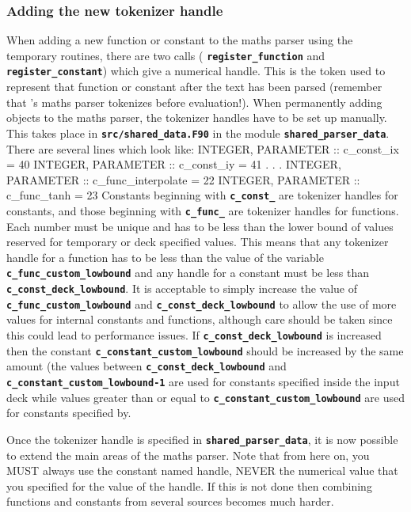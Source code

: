 \documentclass[12pt,a4paper]{article}
\newcommand{\inlinecode}[1]{{\color{warwickred} \bf\texttt{#1}}}
\newcommand{\EPOCH}{{\color{warwickdark}\fontfamily{phv}\selectfont{EPOCH}}}
\newenvironment{boxverbatim}{\lboxverbatim{none}}{\endlboxverbatim}
\begin{document}
\subsubsection{Adding the new tokenizer handle}
When adding a new function or constant to the maths parser using the temporary
routines, there are two calls (\inlinecode{register\_function} and
\inlinecode{register\_constant}) which give a numerical handle. This is the
token used to represent that function or constant after the text has been parsed
(remember that {\EPOCH}'s maths parser tokenizes before evaluation!). When
permanently adding objects to the maths parser, the tokenizer handles have to
be set up manually. This takes place in \inlinecode{src/shared\_data.F90} in
the module \inlinecode{shared\_parser\_data}. There are several lines which
look like:
\begin{boxverbatim}
  INTEGER, PARAMETER :: c_const_ix = 40
  INTEGER, PARAMETER :: c_const_iy = 41
  .
  .
  .
  INTEGER, PARAMETER :: c_func_interpolate = 22
  INTEGER, PARAMETER :: c_func_tanh = 23
\end{boxverbatim}
Constants beginning with \inlinecode{c\_const\_} are tokenizer handles for
constants, and those beginning with \inlinecode{c\_func\_} are tokenizer handles
for functions. Each number must be unique and has to be less than
the lower bound of values reserved for temporary or deck
specified values. This means that any tokenizer handle for a function has to be
less than the value of the variable \inlinecode{c\_func\_custom\_lowbound} and
any handle for a constant must be less than
\inlinecode{c\_const\_deck\_lowbound}. It is acceptable to simply increase the
value of \inlinecode{c\_func\_custom\_lowbound} and
\inlinecode{c\_const\_deck\_lowbound} to
allow the use of more values for internal constants and functions, although
care should be taken since this could lead to performance issues.
If \inlinecode{c\_const\_deck\_lowbound} is increased then the constant
\inlinecode{c\_constant\_custom\_lowbound} should be increased by the same
amount (the values between \inlinecode{c\_const\_deck\_lowbound} and\linebreak
\inlinecode{c\_constant\_custom\_lowbound-1} are used for constants specified
inside the input deck while values greater than or equal to
\inlinecode{c\_constant\_custom\_lowbound} are used for constants specified
by\linebreak \inlinecode{register\_constant}.

Once the tokenizer handle is specified in \inlinecode{shared\_parser\_data}, it
is now possible to extend the main areas of the maths parser. Note that from
here on, you MUST always use the constant named handle, NEVER the numerical
value that you specified for the value of the handle. If this is not done
then combining functions and constants from several sources becomes much harder.
\end{document}
